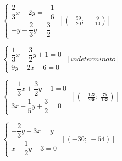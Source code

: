 \begin{esercizio}[\Ast]
\begin{multicols}{2}
\begin{enumeratea}
{\longarray
\item 
$\left\{\begin{array}{l}\dfrac{2}{3}x-2y=-{\dfrac{1}{6}}\\-y-\dfrac{2}{3}
y=\dfrac{3}{2} \end{array}\right.$
 \hfill $\left[\left(-{\frac{59}{20}};~-\frac{9}{10}\right)\right]$
\item $\left\{\begin{array}{l}\dfrac{1}{3}x-\dfrac{3}{2}y+1=0\\9y-2x-6=0 
\end{array}\right.$
 \hfill $\left[indeterminato\right]$
\item 
$\left\{\begin{array}{l}-{\dfrac{1}{3}}x+\dfrac{3}{2}y-1=0\\3x-\dfrac{1}{5}
y+\dfrac{3}{2}=0 \end{array}\right.$
 \hfill $\left[(-{\frac{123}{266}};~\frac{75}{133})\right]$
\item $\left\{\begin{array}{l}-{\dfrac{2}{3}}y+3x=y\\x-\dfrac{1}{2}y+3=0 
\end{array}\right.$
 \hfill $\left[(-30;~-54)\right]$}
\end{enumeratea}
\end{multicols}
\end{esercizio}

